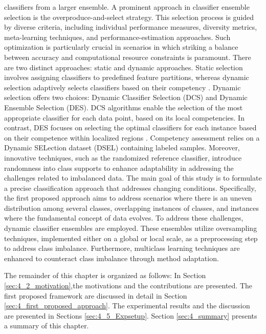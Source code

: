   classifiers from a larger ensemble. A prominent approach in classifier ensemble selection is the overproduce-and-select strategy. This
  selection process is guided by diverse criteria, including individual performance measures, diversity metrics, meta-learning techniques,
  and performance-estimation approaches. Such optimization is particularly crucial in scenarios in which striking a balance between
  accuracy and computational resource constraints is paramount. There are two distinct approaches: static and dynamic approaches.
  Static selection involves assigning classifiers to predefined feature partitions, whereas dynamic selection adaptively selects classifiers
  based on their competency \cite{lysiak2014optimal}. Dynamic selection offers two choices: Dynamic Classifier Selection (DCS) and Dynamic Ensemble
  Selection (DES). DCS algorithms enable the selection of the most appropriate classifier for each data point, based on its local competencies. In contrast, DES focuses on selecting the optimal classifiers for each instance based on their competence within localized
  regions \cite{cruz2017meta, widmer1996learning, lu2016concept}. Competency assessment relies on a Dynamic SELection dataset (DSEL) containing labeled samples. Moreover,
  innovative techniques, such as the randomized reference classifier, introduce randomness into class supports to enhance adaptability
  in addressing the challenges related to imbalanced data.
  The main goal of this study is to formulate a precise classification approach that addresses changing conditions. Specifically, the
  first proposed approach aims to address scenarios where there is an uneven distribution among several classes, overlapping instances of
  classes, and instances where the fundamental concept of data evolves. To address these challenges, dynamic classifier
  ensembles are employed. These ensembles utilize oversampling techniques, implemented either on a global or local scale, as a preprocessing step to
  address class imbalance. Furthermore, multiclass learning techniques are enhanced to counteract class imbalance through method
  adaptation. 
  
  The remainder of this chapter is organized as follows: In Section \ref{sec:4_2_motivation},the motivations and the contributions are presented. The first proposed framework are discussed in detail in Section \ref{sec:4_first_proposed_approach}. The  experimental results and the discussion are presented in Sections \ref{sec:4_5_Expsetup}. Section \ref{sec:4_summary} presents a summary of this chapter.
  
